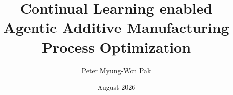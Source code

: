 \documentclass[letterpaper, 11pt]{uithesis}
\title{Continual Learning enabled Agentic Additive Manufacturing Process Optimization}
\author{Peter Myung-Won Pak}
\date{August 2026}
\renewcommand{\thesubsection}{\arabic{subsection}}
\begin{document}
\setcounter{tocdepth}{4}
\setcounter{secnumdepth}{4}
\renewcommand{\thesubsection}{\arabic{chapter}.\arabic{section}.\arabic{subsection}}

\titlepage

\copyrightPage

\frontmatter





\tableofcontents

\listoffigures

\listoftables

\mainmatter









\backmatter




\newpage
\end{document}
